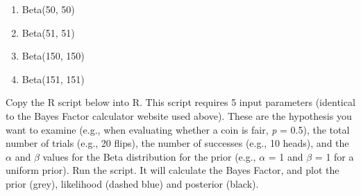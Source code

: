 \documentclass[
]{krantz}
\providecommand{\tightlist}{%
  \setlength{\itemsep}{0pt}\setlength{\parskip}{0pt}}
\begin{document}
\begin{enumerate}
\def\labelenumi{\Alph{enumi})}
\tightlist
\item
  Beta(50, 50)
\item
  Beta(51, 51)
\item
  Beta(150, 150)
\item
  Beta(151, 151)
\end{enumerate}

Copy the R script below into R. This script requires 5 input parameters (identical to the Bayes Factor calculator website used above). These are the hypothesis you want to examine (e.g., when evaluating whether a coin is fair, \emph{p} = 0.5), the total number of trials (e.g., 20 flips), the number of successes (e.g., 10 heads), and the \(\alpha\) and \(\beta\) values for the Beta distribution for the prior (e.g., \(\alpha\) = 1 and \(\beta\) = 1 for a uniform prior). Run the script. It will calculate the Bayes Factor, and plot the prior (grey), likelihood (dashed blue) and posterior (black).
\end{document}
